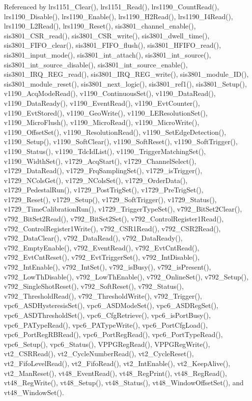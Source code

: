 Referenced by lrs1151\_\-Clear(), lrs1151\_\-Read(), lrs1190\_\-CountRead(), lrs1190\_\-Disable(), lrs1190\_\-Enable(), lrs1190\_\-H2Read(), lrs1190\_\-I4Read(), lrs1190\_\-L2Read(), lrs1190\_\-Reset(), sis3801\_\-channel\_\-enable(), sis3801\_\-CSR\_\-read(), sis3801\_\-CSR\_\-write(), sis3801\_\-dwell\_\-time(), sis3801\_\-FIFO\_\-clear(), sis3801\_\-FIFO\_\-flush(), sis3801\_\-HFIFO\_\-read(), sis3801\_\-input\_\-mode(), sis3801\_\-int\_\-attach(), sis3801\_\-int\_\-source(), sis3801\_\-int\_\-source\_\-disable(), sis3801\_\-int\_\-source\_\-enable(), sis3801\_\-IRQ\_\-REG\_\-read(), sis3801\_\-IRQ\_\-REG\_\-write(), sis3801\_\-module\_\-ID(), sis3801\_\-module\_\-reset(), sis3801\_\-next\_\-logic(), sis3801\_\-ref1(), sis3801\_\-Setup(), v1190\_\-AcqModeRead(), v1190\_\-ContinuousSet(), v1190\_\-DataRead(), v1190\_\-DataReady(), v1190\_\-EventRead(), v1190\_\-EvtCounter(), v1190\_\-EvtStored(), v1190\_\-GeoWrite(), v1190\_\-LEResolutionSet(), v1190\_\-MicroFlush(), v1190\_\-MicroRead(), v1190\_\-MicroWrite(), v1190\_\-OffsetSet(), v1190\_\-ResolutionRead(), v1190\_\-SetEdgeDetection(), v1190\_\-Setup(), v1190\_\-SoftClear(), v1190\_\-SoftReset(), v1190\_\-SoftTrigger(), v1190\_\-Status(), v1190\_\-TdcIdList(), v1190\_\-TriggerMatchingSet(), v1190\_\-WidthSet(), v1729\_\-AcqStart(), v1729\_\-ChannelSelect(), v1729\_\-DataRead(), v1729\_\-FrqSamplingSet(), v1729\_\-isTrigger(), v1729\_\-NColsGet(), v1729\_\-NColsSet(), v1729\_\-OrderData(), v1729\_\-PedestalRun(), v1729\_\-PostTrigSet(), v1729\_\-PreTrigSet(), v1729\_\-Reset(), v1729\_\-Setup(), v1729\_\-SoftTrigger(), v1729\_\-Status(), v1729\_\-TimeCalibrationRun(), v1729\_\-TriggerTypeSet(), v792\_\-BitSet2Clear(), v792\_\-BitSet2Read(), v792\_\-BitSet2Set(), v792\_\-ControlRegister1Read(), v792\_\-ControlRegister1Write(), v792\_\-CSR1Read(), v792\_\-CSR2Read(), v792\_\-DataClear(), v792\_\-DataRead(), v792\_\-DataReady(), v792\_\-EmptyEnable(), v792\_\-EventRead(), v792\_\-EvtCntRead(), v792\_\-EvtCntReset(), v792\_\-EvtTriggerSet(), v792\_\-IntDisable(), v792\_\-IntEnable(), v792\_\-IntSet(), v792\_\-isBusy(), v792\_\-isPresent(), v792\_\-LowThDisable(), v792\_\-LowThEnable(), v792\_\-OnlineSet(), v792\_\-Setup(), v792\_\-SingleShotReset(), v792\_\-SoftReset(), v792\_\-Status(), v792\_\-ThresholdRead(), v792\_\-ThresholdWrite(), v792\_\-Trigger(), vpc6\_\-ASDHysteresisSet(), vpc6\_\-ASDModeSet(), vpc6\_\-ASDRegSet(), vpc6\_\-ASDThresholdSet(), vpc6\_\-CfgRetrieve(), vpc6\_\-isPortBusy(), vpc6\_\-PATypeRead(), vpc6\_\-PATypeWrite(), vpc6\_\-PortCfgLoad(), vpc6\_\-PortRegRBRead(), vpc6\_\-PortRegRead(), vpc6\_\-PortTypeRead(), vpc6\_\-Setup(), vpc6\_\-Status(), VPPGRegRead(), VPPGRegWrite(), vt2\_\-CSRRead(), vt2\_\-CycleNumberRead(), vt2\_\-CycleReset(), vt2\_\-FifoLevelRead(), vt2\_\-FifoRead(), vt2\_\-IntEnable(), vt2\_\-KeepAlive(), vt2\_\-ManReset(), vt48\_\-EventRead(), vt48\_\-RegPrint(), vt48\_\-RegRead(), vt48\_\-RegWrite(), vt48\_\-Setup(), vt48\_\-Status(), vt48\_\-WindowOffsetSet(), and vt48\_\-WindowSet().
